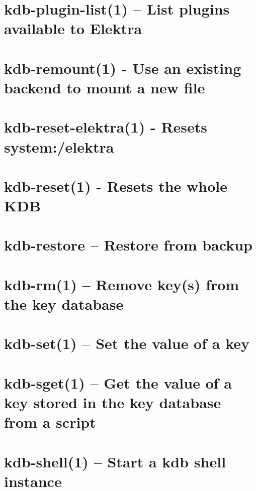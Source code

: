 \let\mypdfximage\pdfximage\def\pdfximage{\immediate\mypdfximage}\documentclass[twoside]{book}
\newcommand{\+}{\discretionary{\mbox{\scriptsize$\hookleftarrow$}}{}{}}
\begin{document}
\chapter{kdb-\/plugin-\/list(1) -- List plugins available to Elektra}
\label{doc_help_kdb-plugin-list_md}

\chapter{kdb-\/remount(1) -\/ Use an existing backend to mount a new file}
\label{doc_help_kdb-remount_md}

\chapter{kdb-\/reset-\/elektra(1) -\/ Resets system\+:/elektra}
\label{doc_help_kdb-reset-elektra_md}

\chapter{kdb-\/reset(1) -\/ Resets the whole KDB}
\label{doc_help_kdb-reset_md}

\chapter{kdb-\/restore -- Restore from backup}
\label{doc_help_kdb-restore_md}

\chapter{kdb-\/rm(1) -- Remove key(s) from the key database}
\label{doc_help_kdb-rm_md}

\chapter{kdb-\/set(1) -- Set the value of a key}
\label{doc_help_kdb-set_md}

\chapter{kdb-\/sget(1) -- Get the value of a key stored in the key database from a script}
\label{doc_help_kdb-sget_md}

\chapter{kdb-\/shell(1) -- Start a kdb shell instance}
\label{doc_help_kdb-shell_md}

\end{document}
